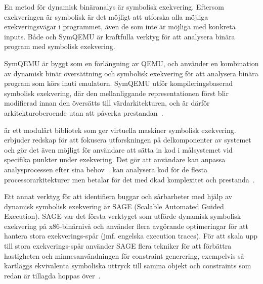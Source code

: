 En metod för dynamisk binäranalys är symbolisk exekvering. Eftersom exekveringen är symbolisk är 
det möjligt att utforska alla möjliga exekveringsvägar i programmet, även de som inte är möjliga
med konkreta inputs. Både \stoe{} och SymQEMU är kraftfulla verktyg för att analysera binära program 
med symbolisk exekvering.

SymQEMU är byggt som en förlängning av QEMU, och använder en kombination av dynamisk binär 
översättning och symbolisk exekvering för att analysera binära program som körs inuti emulatorn.
SymQEMU utför kompileringsbaserad symbolisk exekvering, där den mellanliggande representationen först blir modifierad 
innan den översätts till värdarkitekturen, och är därför arkitekturoberoende utan att påverka prestandan~\cite{symqemu}.

\stoe{} är ett modulärt bibliotek som ger virtuella maskiner symbolisk exekvering. \stoe{} erbjuder 
redskap för att fokusera utforskningen på delkomponenter av systemet och gör det även 
möjligt för användare att sätta in kod i målsystemet vid specifika punkter under 
exekvering. Det gör att användare kan anpassa analysprocessen efter sina behov~\cite{s2e}. 
\stoe{} kan analysera kod för de flesta processorarkitekturer men betalar för det med ökad 
komplexitet och prestanda~\cite{symqemu}. 

Ett annat verktyg för att identifiera buggar och sårbarheter med hjälp av dynamisk symbolisk 
exekvering är SAGE (Scalable Automated Guided Execution).
SAGE var det första verktyget som utförde dynamisk symbolisk exekvering på x86-binärnivå och använder flera 
avgörande optimeringar för att hantera stora exekverings-spår (jmf. engelska execution traces).
För att skala upp till stora exekverings-spår använder SAGE flera tekniker för att förbättra hastigheten och 
minnesanvändningen för constraint generering, exempelvis så kartläggs ekvivalenta symboliska uttryck till samma 
objekt och constraints som redan är tillagda hoppas över~\cite{sage}.
